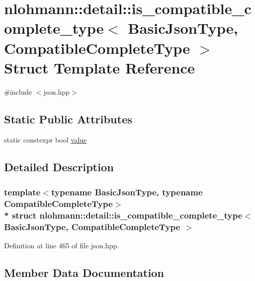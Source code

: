 \hypertarget{structnlohmann_1_1detail_1_1is__compatible__complete__type}{}\section{nlohmann\+:\+:detail\+:\+:is\+\_\+compatible\+\_\+complete\+\_\+type$<$ Basic\+Json\+Type, Compatible\+Complete\+Type $>$ Struct Template Reference}
\label{structnlohmann_1_1detail_1_1is__compatible__complete__type}


{\ttfamily \#include $<$json.\+hpp$>$}

\subsection*{Static Public Attributes}
\begin{DoxyCompactItemize}
\item 
static constexpr bool \hyperlink{structnlohmann_1_1detail_1_1is__compatible__complete__type_a34bed4700a302b79feb045b6bdbda9aa}{value}
\end{DoxyCompactItemize}


\subsection{Detailed Description}
\subsubsection*{template$<$typename Basic\+Json\+Type, typename Compatible\+Complete\+Type$>$\\*
struct nlohmann\+::detail\+::is\+\_\+compatible\+\_\+complete\+\_\+type$<$ Basic\+Json\+Type, Compatible\+Complete\+Type $>$}



Definition at line 465 of file json.\+hpp.



\subsection{Member Data Documentation}

